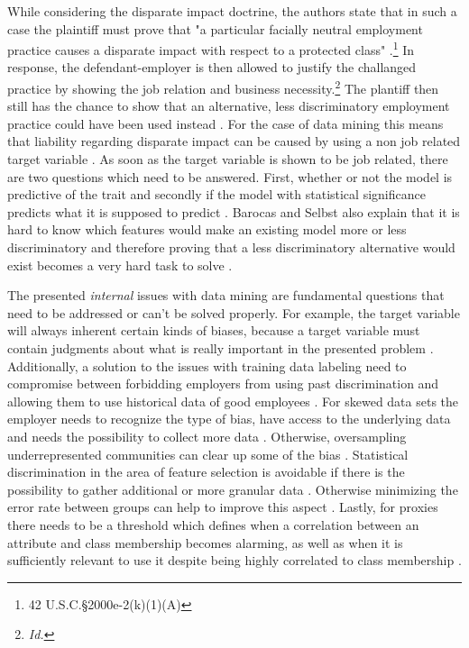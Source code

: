 While considering the disparate impact doctrine, the authors state that in such a case 
the plaintiff must prove that "a particular facially neutral employment practice causes 
a disparate impact with respect to a protected class" \cite{Barocas.2016, titleVII}.\footnote{ 42 U.S.C.§2000e-2(k)(1)(A) } In response, the defendant-employer 
is then allowed to justify the challanged practice by showing the job relation and 
business necessity.\footnote{ \textit{Id.} } The plantiff then still has the chance 
to show that an alternative, less discriminatory employment practice could have been 
used instead \cite{Barocas.2016}. For the case of data mining this means that liability 
regarding disparate impact can be caused by using a non job related target variable 
\cite{Barocas.2016}. As soon as the target variable is shown to be job related, there 
are two questions which need to be answered. First, whether or not the model is 
predictive of the trait and secondly if the model with statistical significance 
predicts what it is supposed to predict \cite{Barocas.2016}. Barocas and Selbst 
also explain that it is hard to know which features would make an existing model more
or less discriminatory and therefore proving that a less discriminatory alternative 
would exist becomes a very hard task to solve \cite{Barocas.2016}.

The presented \textit{internal} issues with data mining are fundamental questions that need to be addressed or can't be solved properly. For example, the target variable will always inherent certain kinds of biases, because a target variable must contain judgments about what is really important in the presented problem \cite{Barocas.2016}. Additionally, a solution to the issues with training data labeling need to compromise between forbidding employers from using past discrimination and allowing them to use historical data of good employees \cite{Barocas.2016}. For skewed data sets the employer needs to recognize the type of bias, have access to the underlying data and needs the possibility to collect more data  \cite{Barocas.2016}. Otherwise, oversampling underrepresented communities can clear up some of the bias \cite{Barocas.2016}. Statistical discrimination in the area of feature selection is avoidable if there is the possibility to gather additional or more granular data \cite{Barocas.2016}. Otherwise minimizing the error rate between groups can help to improve this aspect \cite{Barocas.2016}. Lastly, for proxies there needs to be a threshold which defines when a correlation between an attribute and class membership becomes alarming, as well as when it is sufficiently relevant to use it despite being highly correlated to class membership \cite{Barocas.2016}.

